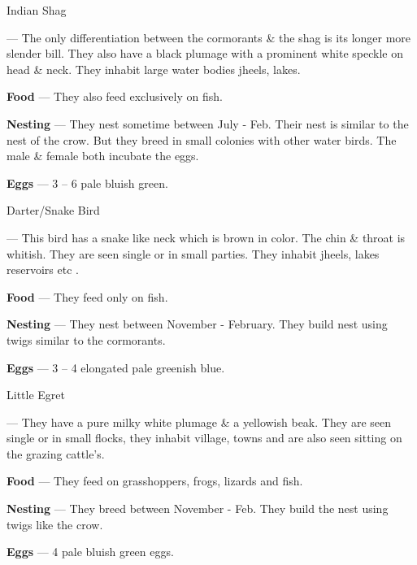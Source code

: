 \begin{bird}{Indian Shag}

 --- The only differentiation between the cormorants \& the shag is its longer more slender bill. They also have a black plumage with a prominent white speckle on head \& neck. They inhabit large water bodies jheels, lakes.

{\large\bf Food} --- They also feed exclusively on fish.

{\large\bf Nesting} --- They nest sometime between July - Feb. Their nest is similar to the nest of the crow. But they breed in small colonies with other water birds. The male \& female both incubate the eggs. 

{\large\bf Eggs} --- 3 -- 6 pale bluish green.
\end{bird}
\newpage

\begin{bird}{Darter/Snake Bird}

 --- This bird has a snake like neck which is brown in color. The chin \& throat is whitish. They are seen single or in small parties. They inhabit jheels, lakes reservoirs etc .

{\large\bf Food} --- They feed only on fish. 

{\large\bf Nesting} --- They nest between November - February. They build nest using twigs similar to the cormorants.

{\large\bf Eggs} --- 3 -- 4 elongated pale greenish blue.
\end{bird}

\begin{bird}{Little Egret}

 --- They have a pure milky white plumage \& a yellowish beak. They are seen single or in small flocks, they inhabit village, towns and are also seen sitting on the grazing cattle's.

{\large\bf Food} --- They feed on grasshoppers, frogs, lizards and fish.

{\large\bf Nesting} --- They breed between November - Feb. They build the nest using twigs like the crow.

{\large\bf Eggs} --- 4 pale bluish green eggs.
\end{bird}

